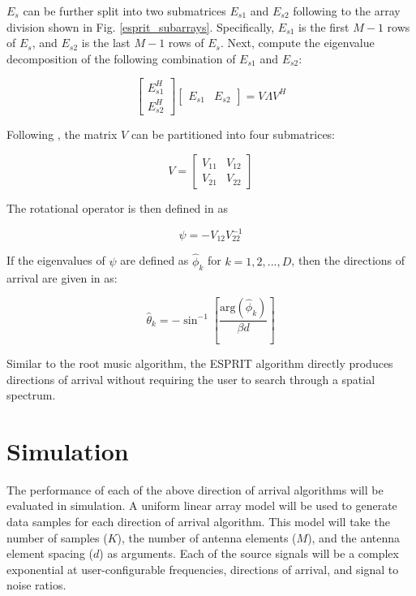 \documentclass[conference]{IEEEtran}
\begin{document}
		$E_s$ can be further split into two submatrices $E_{s1}$ and $E_{s2}$ following to the array division shown in Fig. \ref{esprit_subarrays}. Specifically, $E_{s1}$ is the first $M-1$ rows of $E_s$, and $E_{s2}$ is the last $M-1$ rows of $E_s$. Next, compute the eigenvalue decomposition of the following combination of $E_{s1}$ and $E_{s2}$:
		
		\begin{equation}
			\begin{bmatrix}
				E_{s1}^H\\[6pt]
				E_{s2}^H
			\end{bmatrix}
			\begin{bmatrix}
				E_{s1} & E_{s2}
			\end{bmatrix}
			= V{\Lambda}V^H
		\end{equation}
		
		Following \cite{doa_algorithms_raghu}, the matrix $V$ can be partitioned into four submatrices:
		
		\begin{equation*}
			V = \begin{bmatrix}
				V_{11} & V_{12}\\[6pt]
				V_{21} & V_{22}
			\end{bmatrix}
		\end{equation*}

		The rotational operator is then defined in \cite{root_music_esprit_patwari} as
		
		\begin{equation*}
			\psi = -V_{12}V_{22}^{-1}
		\end{equation*}
		
		If the eigenvalues of $\psi$ are defined as $\hat{\phi}_k$ for $k = 1,2,...,D$, then the directions of arrival are given in \cite{doa_algorithms_raghu} as:
		
		\begin{equation}
			\hat{\theta}_k = -\sin^{-1}{\left[\frac{\text{arg}(\hat{\phi}_k)}{{\beta}d}\right]}
		\end{equation}
		
		Similar to the root music algorithm, the ESPRIT algorithm directly produces directions of arrival without requiring the user to search through a spatial spectrum.
		
	\section{Simulation}
	
		The performance of each of the above direction of arrival algorithms will be evaluated in simulation. A uniform linear array model will be used to generate data samples for each direction of arrival algorithm. This model will take the number of samples ($K$), the number of antenna elements ($M$), and the antenna element spacing ($d$) as arguments. Each of the source signals will be a complex exponential at user-configurable frequencies, directions of arrival, and signal to noise ratios.
		
\end{document}
